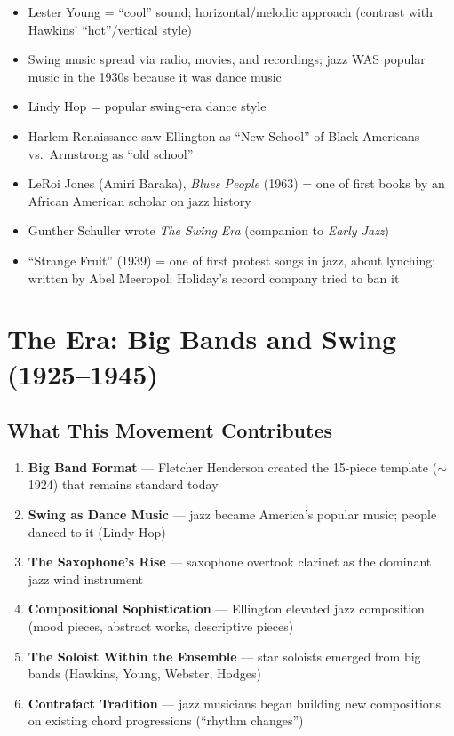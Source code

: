 \documentclass[11pt, letterpaper]{article}
\begin{document}
\begin{itemize}[label=$\square$]
    \item Lester Young = ``cool'' sound; horizontal/melodic approach (contrast with Hawkins' ``hot''/vertical style)
    \item Swing music spread via radio, movies, and recordings; jazz WAS popular music in the 1930s because it was dance music
    \item Lindy Hop = popular swing-era dance style
    \item Harlem Renaissance saw Ellington as ``New School'' of Black Americans vs.\ Armstrong as ``old school''
    \item LeRoi Jones (Amiri Baraka), \textit{Blues People} (1963) = one of first books by an African American scholar on jazz history
    \item Gunther Schuller wrote \textit{The Swing Era} (companion to \textit{Early Jazz})
    \item ``Strange Fruit'' (1939) = one of first protest songs in jazz, about lynching; written by Abel Meeropol; Holiday's record company tried to ban it
\end{itemize}

\newpage

\section{The Era: Big Bands and Swing (1925--1945)}

\subsection{What This Movement Contributes}
\begin{enumerate}
    \item \textbf{Big Band Format} --- Fletcher Henderson created the 15-piece template ($\sim$1924) that remains standard today
    \item \textbf{Swing as Dance Music} --- jazz became America's popular music; people danced to it (Lindy Hop)
    \item \textbf{The Saxophone's Rise} --- saxophone overtook clarinet as the dominant jazz wind instrument
    \item \textbf{Compositional Sophistication} --- Ellington elevated jazz composition (mood pieces, abstract works, descriptive pieces)
    \item \textbf{The Soloist Within the Ensemble} --- star soloists emerged from big bands (Hawkins, Young, Webster, Hodges)
    \item \textbf{Contrafact Tradition} --- jazz musicians began building new compositions on existing chord progressions (``rhythm changes'')
\end{enumerate}
\end{document}
